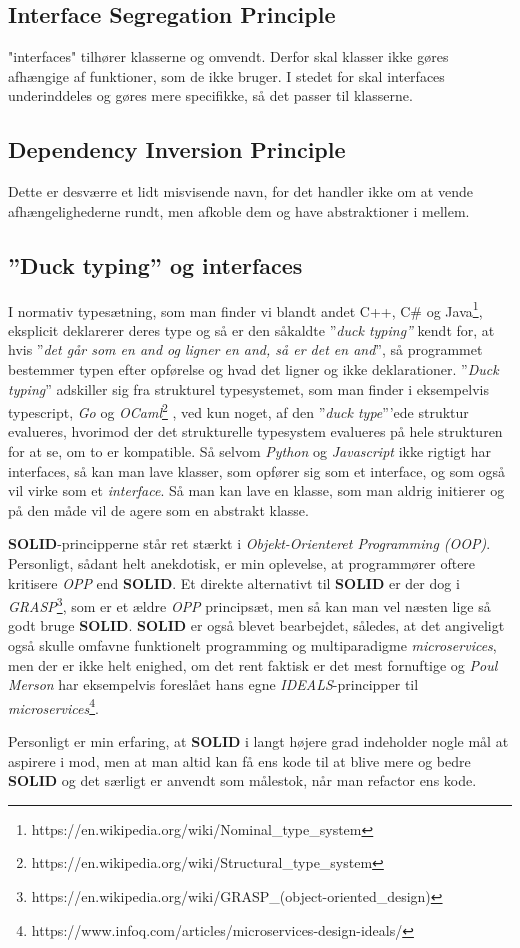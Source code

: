 \documentclass{report}
\begin{document}
\subsection{Interface Segregation Principle}
"interfaces" tilhører klasserne og omvendt. Derfor skal klasser ikke gøres afhængige af funktioner, som de ikke bruger. I stedet for skal interfaces underinddeles og gøres mere specifikke, så det passer til klasserne.
\subsection{Dependency Inversion Principle}
Dette er desværre et lidt misvisende navn, for det handler ikke om at vende afhængelighederne rundt, men afkoble dem og have abstraktioner i mellem.

\subsection{”Duck typing” og interfaces}
I normativ typesætning, som man finder vi blandt andet C++, C\# og Java\footnote{  https://en.wikipedia.org/wiki/Nominal\_type\_system}, eksplicit deklarerer deres type og så er den såkaldte ”\textit{duck typing”} kendt for, at hvis ”\textit{det går som en and og ligner en and, så er det en and}”, så programmet bestemmer typen efter opførelse og hvad det ligner og ikke deklarationer. ”\textit{Duck typing}” adskiller sig fra strukturel typesystemet, som man finder i eksempelvis typescript, \textit{Go} og \textit{OCaml}\footnote{https://en.wikipedia.org/wiki/Structural\_type\_system} ,  ved kun noget, af den ”\textit{duck type}”’ede struktur evalueres, hvorimod der det strukturelle typesystem evalueres på hele strukturen  for at se, om to er kompatible. Så selvom \textit{Python} og \textit{Javascript} ikke rigtigt har interfaces, så kan man lave klasser, som opfører sig som et interface, og som også vil virke som et \textit{interface}. Så man  kan  lave en klasse, som man aldrig initierer og på den måde vil de agere som en abstrakt klasse.\par{}
\textbf{SOLID}-principperne står ret stærkt i \textit{Objekt-Orienteret Programming (OOP)}. Personligt, sådant helt anekdotisk, er min oplevelse, at programmører  oftere kritisere \textit{OPP} end \textbf{SOLID}. Et direkte alternativt til \textbf{SOLID} er der dog i \textit{GRASP}\footnote{https://en.wikipedia.org/wiki/GRASP\_(object-oriented\_design)}, som er et ældre \textit{OPP} principsæt, men så kan man vel næsten lige så godt bruge \textbf{SOLID}. \textbf{SOLID} er også blevet bearbejdet, således, at det angiveligt også skulle omfavne funktionelt programming og multiparadigme \textit{microservices}, men der er ikke helt enighed, om det rent faktisk er det mest fornuftige og \textit{Poul Merson} har eksempelvis foreslået hans egne \textit{IDEALS}-principper til \textit{microservices}\footnote{https://www.infoq.com/articles/microservices-design-ideals/}.\par{}
Personligt er min erfaring, at \textbf{SOLID} i langt højere grad indeholder nogle mål at aspirere i mod, men at man altid kan få ens kode til at blive mere og bedre \textbf{SOLID} og det særligt er anvendt som målestok, når man refactor ens kode.
\end{document}
